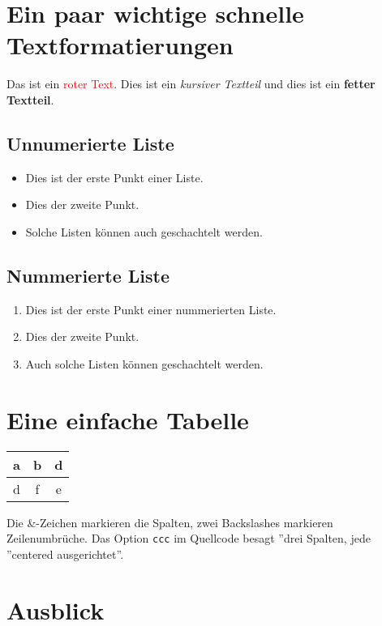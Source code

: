 \section{Ein paar wichtige schnelle Textformatierungen}

Das ist ein \textcolor{red}{roter Text}. Dies ist ein {\itshape kursiver Textteil} und dies ist ein {\bfseries fetter Textteil}. 

\subsection{Unnumerierte Liste}

\begin{itemize}
	\item Dies ist der erste Punkt einer Liste.
  	\item Dies der zweite Punkt.
  	\item Solche Listen können auch geschachtelt werden.
\end{itemize} 

\subsection{Nummerierte Liste}

\begin{enumerate}
	\item Dies ist der erste Punkt einer nummerierten Liste.
	\item Dies der zweite Punkt.
	\item Auch solche Listen können geschachtelt werden.
\end{enumerate}  		


\section{Eine einfache Tabelle}

\begin{center}
	\begin{tabular}{ccc}
		a & b & d	\\ \hline
		d & f & e
	\end{tabular}
\end{center}

Die \&-Zeichen markieren die Spalten, zwei Backslashes markieren Zeilenumbrüche. Das Option \texttt{ccc} im Quellcode besagt ''drei Spalten, jede ''centered ausgerichtet''. 

\section{Ausblick}


